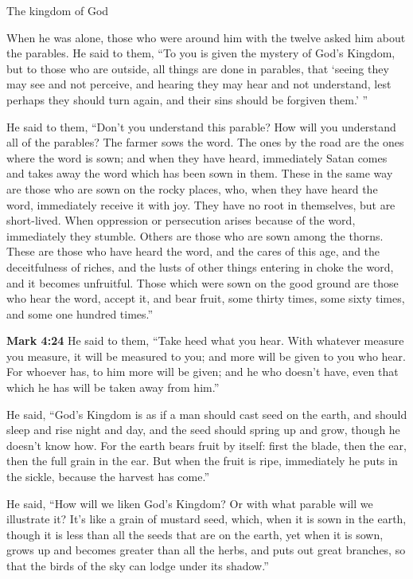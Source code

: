 \documentclass[10pt,twoside]{article} %
\newcommand{\quotesize}{\normalsize{}}
\newenvironment{quotetext}{\begingroup\quotesize}{\endgroup}
\newcommand{\bible}[2]{\begin{quotetext}\textbf{#1} #2\end{quotetext}}
\newcommand{\gospelmark}[2]{\bible{Mark #1}{#2}}
\begin{document}
\begin{section}{The kingdom of God}
{  When he was alone, those who were around him with the twelve asked him about the parables.   He said to them, ``To you is given the mystery of God's Kingdom, but to those who are outside, all things are done in parables,    that `seeing they may see and not perceive, and hearing they may hear and not understand, lest perhaps they should turn again, and their sins should be forgiven them.' ''

  He said to them, ``Don't you understand this parable? How will you understand all of the parables?    The farmer sows the word.    The ones by the road are the ones where the word is sown; and when they have heard, immediately Satan comes and takes away the word which has been sown in them.    These in the same way are those who are sown on the rocky places, who, when they have heard the word, immediately receive it with joy.    They have no root in themselves, but are short-lived. When oppression or persecution arises because of the word, immediately they stumble.    Others are those who are sown among the thorns. These are those who have heard the word,    and the cares of this age, and the deceitfulness of riches, and the lusts of other things entering in choke the word, and it becomes unfruitful.    Those which were sown on the good ground are those who hear the word, accept it, and bear fruit, some thirty times, some sixty times, and some one hundred times.''}


\gospelmark{4:24}{
  He said to them, ``Take heed what you hear. With whatever measure you measure, it will be measured to you; and more will be given to you who hear.    For whoever has, to him more will be given; and he who doesn't have, even that which he has will be taken away from him.''

  He said, ``God's Kingdom is as if a man should cast seed on the earth,    and should sleep and rise night and day, and the seed should spring up and grow, though he doesn't know how.    For the earth bears fruit by itself: first the blade, then the ear, then the full grain in the ear.    But when the fruit is ripe, immediately he puts in the sickle, because the harvest has come.''

  He said, ``How will we liken God's Kingdom? Or with what parable will we illustrate it?    It's like a grain of mustard seed, which, when it is sown in the earth, though it is less than all the seeds that are on the earth,    yet when it is sown, grows up and becomes greater than all the herbs, and puts out great branches, so that the birds of the sky can lodge under its shadow.''

}
\end{section}
\end{document}
